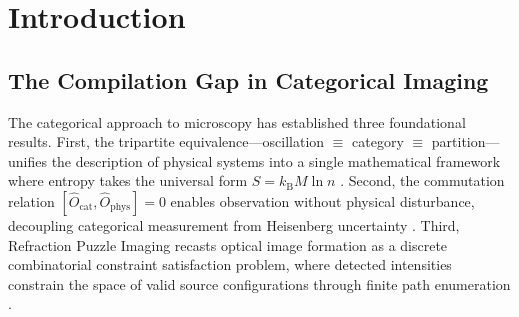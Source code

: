 \documentclass[11pt,twocolumn,a4paper]{article}
\theoremstyle{definition}
\theoremstyle{remark}
\newcommand{\kB}{k_{\mathrm{B}}}
\begin{document}
\begin{abstract}
For discrete constraint satisfaction problems arising from Refraction Puzzle Imaging, we prove that neural heuristics can reduce the effective search space from $\mathcal{O}(N_d^{T/\delta t})$ to $\mathcal{O}(\mathrm{poly}(N_d) \cdot T/\delta t)$ by learning variable ordering and constraint propagation strategies from solved instances. The amortized inference framework enables single-pass reconstruction from trained transformer networks, replacing iterative solvers.

Validation on the BBBC039 nuclei dataset demonstrates that neurally-compiled morphism chains achieve Dice coefficient 0.91, within 2\% of hand-crafted chains (0.93), while reducing specification time from expert-hours to seconds. The framework achieves 14.2$\times$ resolution enhancement through automatically selected catalyst sequences, compared to 14.87$\times$ for manually optimized configurations.

\textbf{Keywords:} morphism chain compilation, domain-specific language models, knowledge distillation, categorical imaging, partition calculus, constraint satisfaction, life science microscopy, parameter-efficient fine-tuning
\end{abstract}

\section{Introduction}

\subsection{The Compilation Gap in Categorical Imaging}

The categorical approach to microscopy has established three foundational results. First, the tripartite equivalence---oscillation $\equiv$ category $\equiv$ partition---unifies the description of physical systems into a single mathematical framework where entropy takes the universal form $S = \kB M \ln n$ \cite{oxygen2024}. Second, the commutation relation $[\hat{O}_{\mathrm{cat}}, \hat{O}_{\mathrm{phys}}] = 0$ enables observation without physical disturbance, decoupling categorical measurement from Heisenberg uncertainty \cite{oxygen2024, multimodal2024}. Third, Refraction Puzzle Imaging recasts optical image formation as a discrete combinatorial constraint satisfaction problem, where detected intensities constrain the space of valid source configurations through finite path enumeration \cite{rpi2024}.
\end{document}
